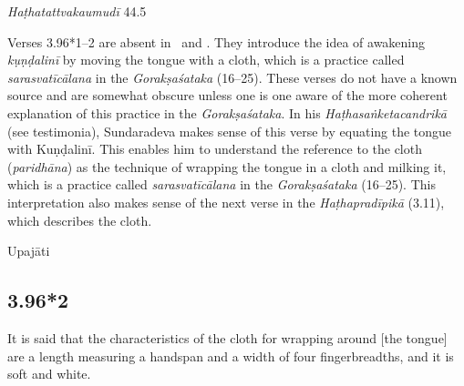 \begin{ekdosis}
\begin{testimonia}[hp03_096_1]
\emph{Haṭhatattvakaumudī} 44.5
\begin{versinnote}
\end{versinnote}
\end{testimonia}

\begin{philcomm}[hp03_096_1]
Verses 3.96*1–2 are absent in \alphaOne\ and \alphaTwo. They introduce the idea of awakening \emph{kụṇḍalinī} by moving the tongue with a cloth, which is a practice called \emph{sarasvatīcālana} in the \emph{Gorakṣaśataka} (16–25). These verses do not have a known source and are somewhat obscure unless one is one aware of the more coherent explanation of this practice in the \emph{Gorakṣaśataka}. In his \emph{Haṭhasaṅketacandrikā} (see testimonia), Sundaradeva makes sense of this verse by equating the tongue with Kuṇḍalinī. This enables him to understand the reference to the cloth (\emph{paridhāna}) as the technique of wrapping the tongue in a cloth and milking it, which is a practice called \emph{sarasvatīcālana} in the \emph{Gorakṣaśataka} (16–25). This interpretation also makes sense of the next verse in the \emph{Haṭhapradīpikā} (3.11), which describes the cloth.

%

\end{philcomm}

\begin{metre}[hp03_096_1]
Upajāti
\end{metre}

\subsection*{3.96*2}
\begin{translation}[hp03_096_2]
It is said that the characteristics of the cloth for wrapping around [the tongue] are a length measuring a handspan and a width of four fingerbreadths, and it is soft and white.
\end{translation}


\end{ekdosis}
